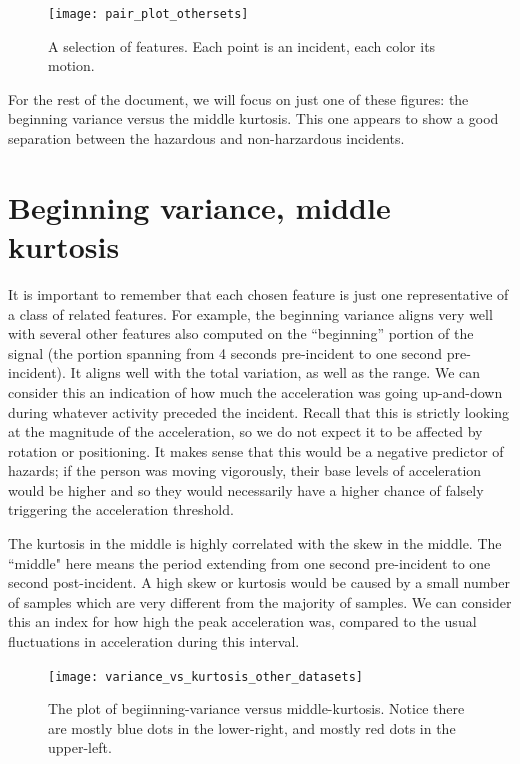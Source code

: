 \documentclass{article}
\begin{document}
\begin{figure}
\texttt{[image: pair\_plot\_othersets]}
\caption{A selection of features. Each point is an incident, each color its motion.}
\label{pairplot}
\end{figure}

For the rest of the document, we will focus on just one of these figures: the beginning variance versus the middle kurtosis. This one appears to show a good separation between the hazardous and non-harzardous incidents.

\section{Beginning variance, middle kurtosis}

It is important to remember that each chosen feature is just one representative of a class of related features. For example, the beginning variance aligns very well with several other features also computed on the ``beginning'' portion of the signal (the portion spanning from 4 seconds pre-incident to one second pre-incident). It aligns well with the total variation, as well as the range. We can consider this an indication of how much the acceleration was going up-and-down during whatever activity preceded the incident. Recall that this is strictly looking at the magnitude of the acceleration, so we do not expect it to be affected by rotation or positioning. It makes sense that this would be a negative predictor of hazards; if the person was moving vigorously, their base levels of acceleration would be higher and so they would necessarily have a higher chance of falsely triggering the acceleration threshold.

The kurtosis in the middle is highly correlated with the skew in the middle. The ``middle" here means the period extending from one second pre-incident to one second post-incident. A high skew or kurtosis would be caused by a small number of samples which are very different from the majority of samples. We can consider this an index for how high the peak acceleration was, compared to the usual fluctuations in acceleration during this interval.

\begin{figure}
\texttt{[image: variance\_vs\_kurtosis\_other\_datasets]}
\caption{The plot of begiinning-variance versus middle-kurtosis. Notice there are mostly blue dots in the lower-right, and mostly red dots in the upper-left.}
\label{othersets}
\end{figure}
\end{document}
